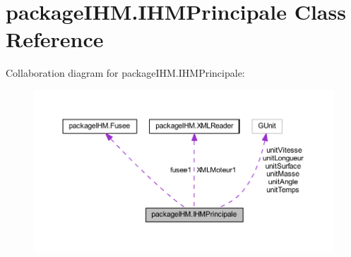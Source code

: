 \hypertarget{classpackage_i_h_m_1_1_i_h_m_principale}{}\section{package\+I\+H\+M.\+I\+H\+M\+Principale Class Reference}
\label{classpackage_i_h_m_1_1_i_h_m_principale}


Collaboration diagram for package\+I\+H\+M.\+I\+H\+M\+Principale\+:
\nopagebreak
\begin{figure}[H]
\begin{center}
\leavevmode
\includegraphics[width=350pt]{classpackage_i_h_m_1_1_i_h_m_principale__coll__graph}
\end{center}
\end{figure}
